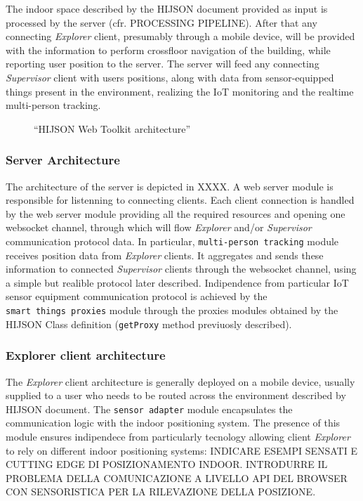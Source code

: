 \documentclass{sig-alternate}
\begin{document}
The indoor space described by the HIJSON document provided as input is
processed by the server (cfr. PROCESSING PIPELINE). After that any
connecting \emph{Explorer} client, presumably through a mobile device,
will be provided with the information to perform crossfloor navigation
of the building, while reporting user position to the server. The server
will feed any connecting \emph{Supervisor} client with users positions,
along with data from sensor-equipped things present in the environment,
realizing the IoT monitoring and the realtime multi-person tracking.

\begin{figure}[!htbp]
\centering
{}
\caption{``HIJSON Web Toolkit architecture''}
\label{fig:pipeline}
\end{figure}

\subsubsection{Server Architecture}\label{server-architecture}

The architecture of the server is depicted in XXXX. A web server module
is responsible for listenning to connecting clients. Each client
connection is handled by the web server module providing all the
required resources and opening one websocket channel, through which will
flow \emph{Explorer} and/or \emph{Supervisor} communication protocol
data. In particular, \texttt{multi-person\ tracking} module receives
position data from \emph{Explorer} clients. It aggregates and sends
these information to connected \emph{Supervisor} clients through the
websocket channel, using a simple but realible protocol later described.
Indipendence from particular IoT sensor equipment communication protocol
is achieved by the \texttt{smart\ things\ proxies} module through the
proxies modules obtained by the HIJSON Class definition
(\texttt{getProxy} method previuosly described).

\subsubsection{Explorer client architecture}\label{explorer-client-architecture}

The \emph{Explorer} client architecture is generally deployed on a
mobile device, usually supplied to a user who needs to be routed across
the environment described by HIJSON document. The
\texttt{sensor\ adapter} module encapsulates the communication logic
with the indoor positioning system. The presence of this module ensures
indipendece from particularly tecnology allowing client \emph{Explorer}
to rely on different indoor positioning systems: INDICARE ESEMPI SENSATI
E CUTTING EDGE DI POSIZIONAMENTO INDOOR. INTRODURRE IL PROBLEMA DELLA
COMUNICAZIONE A LIVELLO API DEL BROWSER CON SENSORISTICA PER LA
RILEVAZIONE DELLA POSIZIONE.
\end{document}

